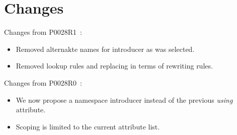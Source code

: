\section*{Changes}

Changes from P0028R1~\cite{p0028r1}:

\begin{itemize}

\item Removed alternakte names for introducer as  was selected.

\item Removed lookup rules and replacing in terms of rewriting rules.

\end{itemize}

Changes from P0028R0~\cite{p0028r0}:

\begin{itemize}

\item We now propose a namespace introducer instead of the previous \emph{using} attribute.

\item Scoping is limited to the current attribute list.

\end{itemize}
